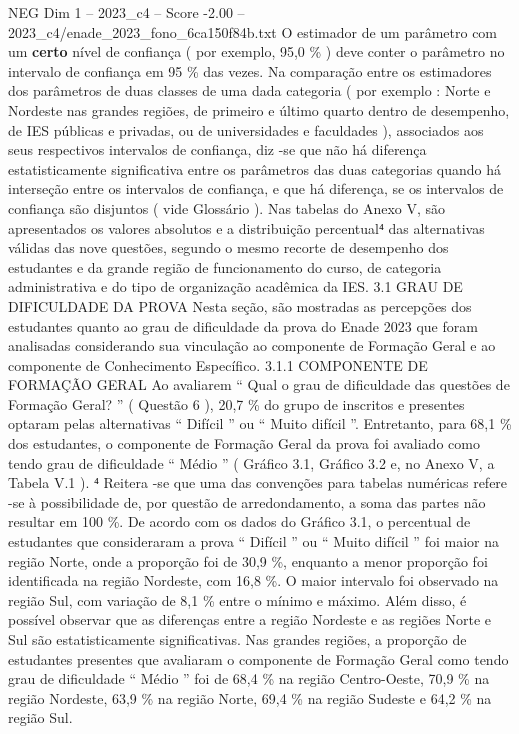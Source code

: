 \begin{textsample}{NEG Dim 1 – 2023\_c4 – Score -2.00 – 2023\_c4/enade\_2023\_fono\_6ca150f84b.txt}
O estimador de um parâmetro com um \textbf{certo} nível de confiança ( por exemplo, 95,0 \% ) deve conter o parâmetro no intervalo de confiança em 95 \% das vezes.
Na comparação entre os estimadores dos parâmetros de duas classes de uma dada categoria ( por exemplo : Norte e Nordeste nas grandes regiões, de primeiro e último quarto dentro de desempenho, de IES públicas e privadas, ou de universidades e faculdades ), associados aos seus respectivos intervalos de confiança, diz -se que não há diferença estatisticamente significativa entre os parâmetros das duas categorias quando há interseção entre os intervalos de confiança, e que há diferença, se os intervalos de confiança são disjuntos ( vide Glossário ).
Nas tabelas do Anexo V, são apresentados os valores absolutos e a distribuição percentual⁴ das alternativas válidas das nove questões, segundo o mesmo recorte de desempenho dos estudantes e da grande região de funcionamento do curso, de categoria administrativa e do tipo de organização acadêmica da IES. 3.1 GRAU DE DIFICULDADE DA PROVA Nesta seção, são mostradas as percepções dos estudantes quanto ao grau de dificuldade da prova do Enade 2023 que foram analisadas considerando sua vinculação ao componente de Formação Geral e ao componente de Conhecimento Específico. 3.1.1 COMPONENTE DE FORMAÇÃO GERAL Ao avaliarem “ Qual o grau de dificuldade das questões de Formação Geral? ” ( Questão 6 ), 20,7 \% do grupo de inscritos e presentes optaram pelas alternativas “ Difícil ” ou “ Muito difícil ”.
Entretanto, para 68,1 \% dos estudantes, o componente de Formação Geral da prova foi avaliado como tendo grau de dificuldade “ Médio ” ( Gráfico 3.1, Gráfico 3.2 e, no Anexo V, a Tabela V.1 ). ⁴ Reitera -se que uma das convenções para tabelas numéricas refere -se à possibilidade de, por questão de arredondamento, a soma das partes não resultar em 100 \%.
De acordo com os dados do Gráfico 3.1, o percentual de estudantes que consideraram a prova “ Difícil ” ou “ Muito difícil ” foi maior na região Norte, onde a proporção foi de 30,9 \%, enquanto a menor proporção foi identificada na região Nordeste, com 16,8 \%.
O maior intervalo foi observado na região Sul, com variação de 8,1 \% entre o mínimo e máximo.
Além disso, é possível observar que as diferenças entre a região Nordeste e as regiões Norte e Sul são estatisticamente significativas.
Nas grandes regiões, a proporção de estudantes presentes que avaliaram o componente de Formação Geral como tendo grau de dificuldade “ Médio ” foi de 68,4 \% na região Centro-Oeste, 70,9 \% na região Nordeste, 63,9 \% na região Norte, 69,4 \% na região Sudeste e 64,2 \% na região Sul.

\end{textsample}
